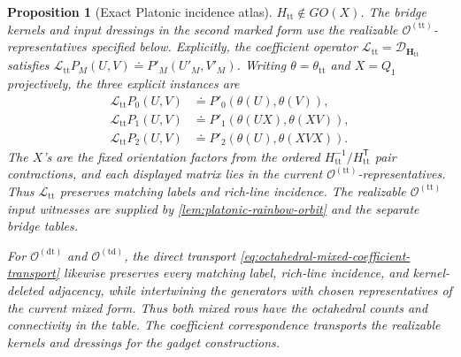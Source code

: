 \documentclass[11pt,letterpaper,onecolumn]{article}
\theoremstyle{plain}
\newtheorem{proposition}[proposition]{Proposition}
\theoremstyle{definition}
\theoremstyle{remark}
\newcommand{\OctTT}{{\mathcal O^{(\mathrm{tt})}}}
\newcommand{\OctDT}{{\mathcal O^{(\mathrm{dt})}}}
\newcommand{\OctTD}{{\mathcal O^{(\mathrm{td})}}}
\begin{document}
\begin{proposition}[Exact Platonic incidence atlas]
\(H_{\mathrm{tt}}\notin GO(X)\). The bridge kernels and input dressings
in the second marked form use the realizable
\(\OctTT\)-representatives specified below.
Explicitly, the coefficient operator
\(\mathcal L_{\mathrm{tt}}=\mathscr D_{\mathbf H_{\mathrm{tt}}}\) satisfies
\(\mathcal L_{\mathrm{tt}}P_M(U,V)\doteq P'_M(U'_M,V'_M)\).  Writing
\(\theta=\theta_{\mathrm{tt}}\) and \(X=Q_1\) projectively, the three explicit
instances are
\[
\begin{aligned}
\mathcal L_{\mathrm{tt}}P_0(U,V)&\doteq P'_0(\theta(U),\theta(V)),\\
\mathcal L_{\mathrm{tt}}P_1(U,V)&\doteq P'_1(\theta(UX),\theta(XV)),\\
\mathcal L_{\mathrm{tt}}P_2(U,V)&\doteq P'_2(\theta(U),\theta(XVX)).
\end{aligned}
\]
The \(X\)'s are the fixed orientation factors from the ordered
\(H_{\mathrm{tt}}^{-1}/H_{\mathrm{tt}}^{\mathsf T}\) pair contractions, and
each displayed matrix lies in the current \(\OctTT\)-representatives.
Thus \(\mathcal L_{\mathrm{tt}}\)
preserves matching labels and rich-line
incidence. The realizable \(\OctTT\) input
witnesses are supplied by \cref{lem:platonic-rainbow-orbit} and the separate
bridge tables.

For \(\OctDT\) and \(\OctTD\), the direct transport
\cref{eq:octahedral-mixed-coefficient-transport} likewise preserves every
matching label, rich-line incidence, and kernel-deleted adjacency, while
intertwining the generators with chosen representatives of the current mixed
form.  Thus both mixed rows have the octahedral counts and connectivity in
the table.  The coefficient correspondence transports the realizable kernels
and dressings for the gadget constructions.


\end{proposition}
\end{document}
